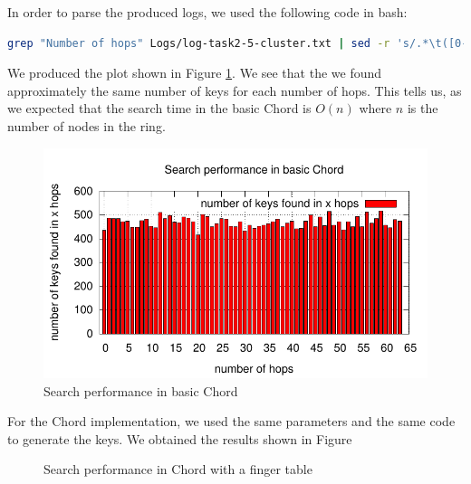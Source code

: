 \documentclass[a4paper, 11pt]{article}
\theoremstyle{plain}
\theoremstyle{definition}
\begin{document}
   
    In order to parse the produced logs, we used the following code in bash:
\begin{lstlisting}[style=luaCode, language=bash, caption=Parser for the logs]
grep "Number of hops" Logs/log-task2-5-cluster.txt | sed -r 's/.*\t([0-9]{1,2})$/\1/g' | sort -n | uniq -c | sed -r 's/ +([0-9]+)/\2 \1/g' >> ParsedLogs/log-task2-5-cluster.txt
\end{lstlisting}
    
    We produced the plot shown in Figure \ref{fig:search-basic-chord}. We see that the we found approximately
    the same number of keys for each number of hops. This tells us, as we expected that the search time in the
    basic Chord is $O(n)$ where $n$ is the number of nodes in the ring. 


    \begin{figure}[h]
      \centering
      \includegraphics{plots/task2-2-cluster.pdf}
      \caption{Search performance in basic Chord}
      \label{fig:search-basic-chord}
    \end{figure}

    

    For the Chord implementation, we used the same parameters and the same code to generate the keys. We
    obtained the results shown in Figure

    \begin{figure}[h]
      \centering
      \caption{Search performance in Chord with a finger table}
      \label{fig:search-perf-chord-fing-table}
    \end{figure}
    

    

  













	
\end{document}
